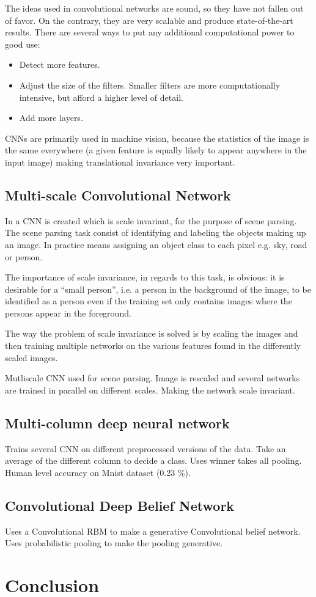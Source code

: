 \documentclass[11pt]{article}
\begin{document}
The ideas used in convolutional networks are sound, so they have not fallen out of favor.  On the contrary, they are very scalable and produce state-of-the-art results.  There are several ways to put any additional computational power to good use:
\begin{itemize}
\item Detect more features.
\item Adjust the size of the filters.  Smaller filters are more computationally intensive, but afford a higher level of detail.
\item Add more layers.
\end{itemize}

CNNs are primarily used in machine vision, because the statistics of the image is the same everywhere (a given feature is equally likely to appear anywhere in the input image) making translational invariance very important.

\subsection{Multi-scale Convolutional Network}

In \cite{farabet} a CNN is created which is scale invariant, for the purpose of scene parsing.  The scene parsing task consist of identifying and labeling the objects making up an image.  In practice means assigning an object class to each pixel e.g. sky, road or person.

The importance of scale invariance, in regards to this task, is obvious: it is desirable for a ``small person'', i.e. a person in the background of the image, to be identified as a person even if the training set only contains images where the persons appear in the foreground.

The way the problem of scale invariance is solved is by scaling the images and then training multiple networks on the various features found in the differently scaled images.



Mutliscale CNN used for scene parsing. Image is rescaled and several
networks are trained in parallel on different scales. Making the network
scale invariant.



\subsection{Multi-column deep neural network}
\cite{ciresan}
Trains several CNN on different preprocessed versions of the data. Take an average
of the different column to decide a class. Uses winner takes all pooling.
Human level accuracy on Mnist dataset (0.23 \%).


\subsection{Convolutional Deep Belief Network}

\cite{lee}
Uses a Convolutional RBM to make a generative Convolutional belief network.
Uses probabilistic pooling to make the pooling generative.

\section{Conclusion}



\end{document}
